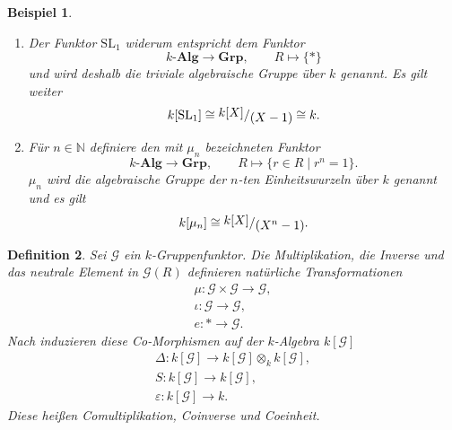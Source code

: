 \documentclass[a4paper, 11pt]{scrartcl}
\newcommand{\N}{\mathbb{N}}
\newcommand{\ringquot}[2]{{\raisebox{.2em}{\(#1\)}/\raisebox{-.2em}{\(#2\)}}}
\theoremstyle{basicstyle}
\newtheorem{definition}{Definition}[section]
\newtheorem{beispiel}[definition]{Beispiel}
\begin{document}
\begin{beispiel}
\begin{enumerate}
            \item Der Funktor \(\text{SL}_1\) widerum entspricht dem Funktor
                \[k\textbf{-Alg} \longrightarrow \textbf{Grp}, \qquad R \mapsto \{\ast\}\]
                und wird deshalb die \emph{triviale algebraische Gruppe über \(k\)} genannt.
                Es gilt weiter
                \[k[\text{SL}_1] \cong \ringquot{k[X]}{(X-1)} \cong k.\]

            \item Für \(n \in \N\) definiere den mit \(\mu_n\) bezeichneten Funktor
                \[k\textbf{-Alg} \longrightarrow \textbf{Grp}, \qquad R \mapsto \{r \in R \;\vert\; r^n = 1\}.\]
                \(\mu_n\) wird die \emph{algebraische Gruppe der \(n\)-ten Einheitswurzeln über \(k\)} genannt und es gilt
                \[k[\mu_n] \cong \ringquot{k[X]}{(X^n - 1)}.\]
        \end{enumerate}
    \end{beispiel}

    \begin{definition}
        Sei \(\mathcal{G}\) ein \(k\)-Gruppenfunktor.
        Die Multiplikation, die Inverse und das neutrale Element in \(\mathcal{G}(R)\) definieren natürliche Transformationen
        \begin{gather*}
            \mu : \mathcal{G} \times \mathcal{G} \longrightarrow \mathcal{G}, \\
            \iota : \mathcal{G} \longrightarrow \mathcal{G}, \\
            e : \ast \longrightarrow \mathcal{G}.
        \end{gather*}
        Nach  induzieren diese Co-Morphismen auf der \(k\)-Algebra \(k[\mathcal{G}]\)
        \begin{gather*}
            \Delta : k[\mathcal{G}] \longrightarrow k[\mathcal{G}] \otimes_k k[\mathcal{G}], \\
            S: k[\mathcal{G}] \longrightarrow k[\mathcal{G}], \\
            \varepsilon : k[\mathcal{G}] \longrightarrow k.
        \end{gather*}
        Diese heißen \emph{Comultiplikation}, \emph{Coinverse} und \emph{Coeinheit}.
    \end{definition}
\end{document}
